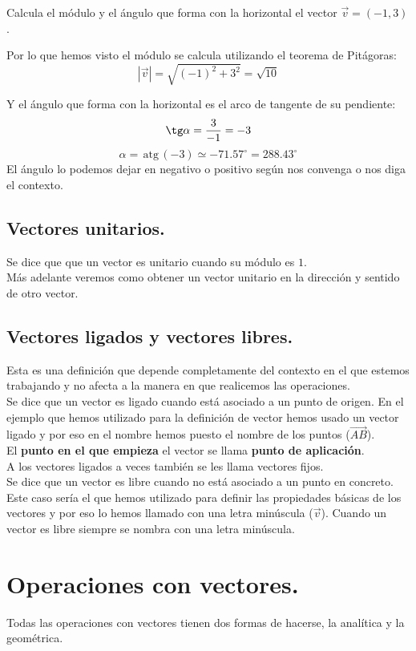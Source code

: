 \documentclass[a4paper,11pt,answers]{exam}
\newcommand{\atg}{\,\mathrm{atg}\,}
\newcommand{\degree}{^\circ}
\begin{document}
\begin{questions}
\question Calcula el módulo y el ángulo que forma con la horizontal el vector $\vec{v} = (-1,3)$.
  \begin{solution}
    Por lo que hemos visto el módulo se calcula utilizando el teorema de Pitágoras:
    \[|\vec{v}| = \sqrt{(-1)^2 + 3^2} = \sqrt{10}\]

    Y el ángulo que forma con la horizontal es el arco de tangente de su pendiente:
    \[\tg \alpha = \frac{3}{-1} = -3\]
    \[\alpha = \atg (-3) \simeq -71.57\degree = 288.43\degree\]
    El ángulo lo podemos dejar en negativo o positivo según nos convenga o nos diga el contexto.
  \end{solution}
\end{questions}
\subsection{Vectores unitarios.}
Se dice que que un vector es unitario cuando su módulo es $1$.\\
Más adelante veremos como obtener un vector unitario en la dirección y sentido de otro vector.

\subsection{Vectores ligados y vectores libres.}
Esta es una definición que depende completamente del contexto en el que estemos trabajando y no
afecta a la manera en que realicemos las operaciones.\\

Se dice que un vector es ligado cuando está asociado a un punto de origen. En el ejemplo que hemos
utilizado para la definición de vector hemos usado un vector ligado y por eso en el nombre
hemos puesto el nombre de los puntos ($\overrightarrow{AB}$).\\
El \textbf{punto en el que empieza} el vector se llama \textbf{punto de aplicación}.\\
A los vectores ligados a veces también se les llama vectores fijos.\\

Se dice que un vector es libre cuando no está asociado a un punto en concreto. Este caso sería el
que hemos utilizado para definir las propiedades básicas de los vectores y por eso lo hemos
llamado con una letra minúscula ($\vec{v}$). Cuando un vector es libre siempre se nombra con
una letra minúscula.

\section{Operaciones con vectores.}
Todas las operaciones con vectores tienen dos formas de hacerse, la analítica y la geométrica.\\
\end{document}
